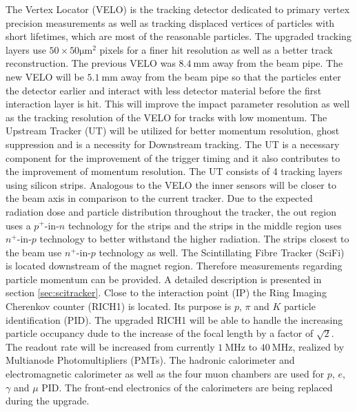 The Vertex Locator (VELO) is the tracking detector dedicated to primary vertex precision measurements as well as tracking displaced vertices of particles with short lifetimes, which are most of the reasonable particles. The upgraded tracking layers use $50\times50\si{\micro\metre}^2$ pixels for a finer hit resolution as well as a better track reconstruction. The previous VELO was $\SI{8.4}{\milli\metre}$ away from the beam pipe. The new VELO will be $\SI{5.1}{\milli\metre}$ away from the beam pipe so that the particles enter the detector earlier and interact with less detector material before the first interaction layer is hit.
This will improve the impact parameter resolution as well as the tracking resolution of the VELO for tracks with low momentum\cite{Piucci}.
The Upstream Tracker (UT) will be utilized for better momentum resolution, ghost suppression and is a necessity for Downstream tracking.
The UT is a necessary component for the improvement of the trigger timing and it also contributes to the improvement of momentum resolution. The UT consists of 4 tracking layers using silicon strips. Analogous to the VELO the inner sensors will be closer to the beam axis in comparison to the current tracker.
Due to the expected radiation dose and particle distribution throughout the tracker, the out region uses a $p^{+}$-in-$n$ technology for the strips and the strips in the middle region uses $n^{+}$-in-$p$ technology to better withstand the higher radiation. The strips closest to the beam use $n^{+}$-in-$p$ technology as well.
The Scintillating Fibre Tracker (SciFi) is located downstream of the magnet region. Therefore measurements regarding particle momentum can be provided. A detailed description is presented in section \ref{sec:scitracker}.
Close to the interaction point (IP) the Ring Imaging Cherenkov counter (RICH1) is located. Its purpose is $p$, $\pi$ and $K$ particle identification (PID).
The upgraded RICH1 will be able to handle the increasing particle occupancy dude to the increase of the focal length by a factor of $\sqrt{2}$.
The readout rate will be increased from currently $\SI{1}{\mega\hertz}$ to $\SI{40}{\mega\hertz}$, realized by Multianode Photomultipliers (PMTs).
The hadronic calorimeter and electromagnetic calorimeter as well as the four muon chambers are used for $p$, $e$, $\gamma$ and $\mu$ PID. The front-end electronics of the calorimeters are being replaced during the upgrade.

